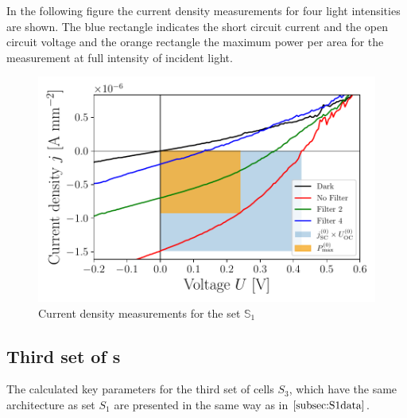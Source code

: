 In the following figure the current density measurements for four light intensities are shown. The blue rectangle indicates the short circuit current and the open circuit voltage and the orange rectangle the maximum power per area for the measurement at full intensity of incident light.

\begin{figure}[h]\centering
\includegraphics[width=\columnwidth]{../../../IV-Curve-Analysis/OSC1Graph.pdf}
\caption{Current density measurements for the set $\mathbb{S}_1$}
\label{fig:OSC1Graph}
\end{figure}

\subsection{Third set of \BHSC s}

The calculated key parameters for the third set of cells $S_3$, which have the same architecture as set $S_1$ are presented in the same way as in $\ref{subsec:S1data}$.


